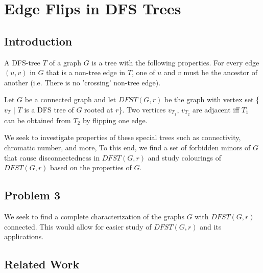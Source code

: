 \documentclass[../main.tex]{subfiles}
\begin{document}
	
\section{Edge Flips in DFS Trees}
\subsection{Introduction}
A DFS-tree $T$ of a graph $G$ is a tree with the following properties. For every edge $(u,v)$ in $G$ that is a non-tree edge in $T$, one of $u$ and $v$ must be the ancestor of another (i.e. There is no 'crossing' non-tree edge).

Let $G$ be a connected graph and let $DFST(G,r)$ be the graph with vertex set \{$v_T$ | $T$ is a DFS tree of $G$ rooted at $r$\}. Two vertices $v_{T_1}$, $v_{T_2}$ are adjacent iff $T_1$ can be obtained from $T_2$ by flipping one edge. 

We seek to investigate properties of these special trees such as connectivity, chromatic number, and more, To this end, we find a set of forbidden minors of $G$ that cause disconnectedness in $DFST(G,r)$ and study colourings of $DFST(G,r)$ based on the properties of $G$.  


\subsection{Problem 3}
We seek to find a complete characterization of the graphs $G$ with $DFST(G,r)$ connected. This would allow for easier study of $DFST(G,r)$ and its applications.  

\subsection{Related Work}




\end{document}
